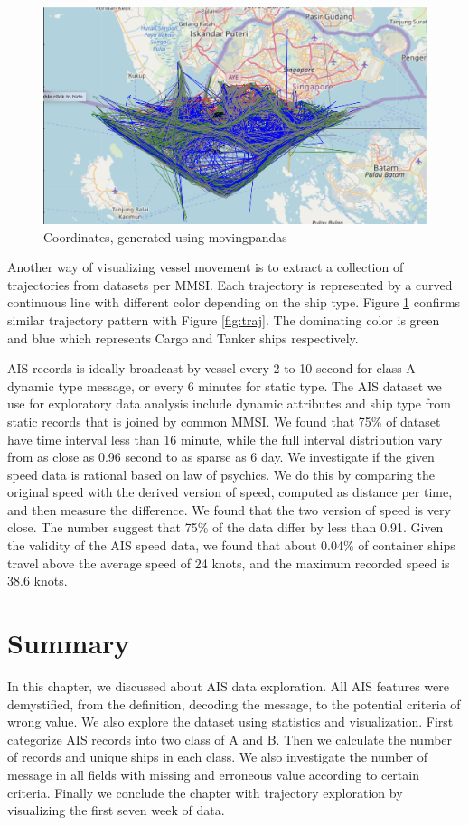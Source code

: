 \begin{figure}[t!]
    \centering
    \includegraphics[width=12cm]{pic/ch-eda/trajectories_mpd.png}
    \caption{Coordinates, generated using movingpandas}
    \label{fig:mpd}
\end{figure}

Another way of visualizing vessel movement is to extract a collection of trajectories from datasets per MMSI. Each trajectory is represented by a curved continuous line with different color depending on the ship type. Figure \ref{fig:mpd} confirms similar trajectory pattern with Figure \ref{fig:traj}. The dominating color is green and blue which represents Cargo and Tanker ships respectively. 

AIS records is ideally broadcast by vessel every 2 to 10 second for class A dynamic type message, or every 6 minutes for static type. The AIS dataset we use for exploratory data analysis include dynamic attributes and ship type from static records that is joined by common MMSI. We found that 75\% of dataset have time interval less than 16 minute, while the full interval distribution vary from as close as 0.96 second to as sparse as 6 day. We investigate if the given speed data is rational based on law of psychics. We do this by comparing the original speed with the derived version of speed, computed as distance per time, and then measure the difference. We found that the two version of speed is very close. The number suggest that 75\% of the data differ by less than 0.91. Given the validity of the AIS speed data, we found that about 0.04\% of container ships travel above the average speed of 24 knots, and the maximum recorded speed is 38.6 knots.

\section{Summary}
In this chapter, we discussed about AIS data exploration. All AIS features were demystified, from the definition, decoding the message, to the potential criteria of wrong value. We also explore the dataset using statistics and visualization. First categorize AIS records into two class of A and B. Then we calculate the number of records and unique ships in each class. We also investigate the number of message in all fields with missing and erroneous value according to certain criteria. Finally we conclude the chapter with trajectory exploration by visualizing the first seven week of data.